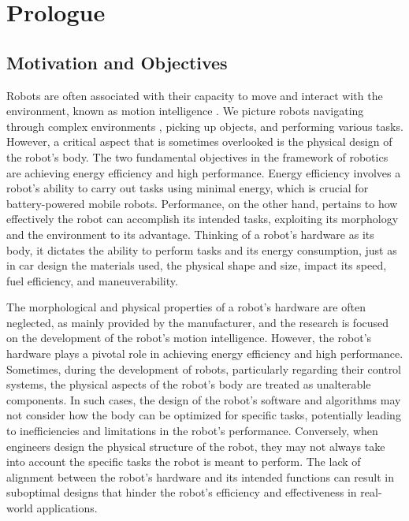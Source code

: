 \chapter*{Prologue}
\label{chp:00-Prologue}

\section*{Motivation and Objectives}

Robots are often associated with their capacity to move and interact with the environment, known as motion intelligence . We picture robots navigating through complex environments , picking up objects, and performing various tasks. However, a critical aspect that is sometimes overlooked is the physical design of the robot's body. The two fundamental objectives in the framework of robotics are achieving energy efficiency and high performance. Energy efficiency involves a robot's ability to carry out tasks using minimal energy, which is crucial for battery-powered mobile robots. Performance, on the other hand, pertains to how effectively the robot can accomplish its intended tasks, exploiting its morphology and the environment to its advantage. Thinking of a robot's hardware as its body, it dictates the ability to perform tasks and its energy consumption, just as in car design the materials used, the physical shape and size, impact its speed, fuel efficiency, and maneuverability.

The morphological and physical properties of a robot's hardware are often neglected, as mainly provided by the manufacturer, and the research is focused on the development of the robot's motion intelligence. However, the robot's hardware plays a pivotal role in achieving energy efficiency and high performance.
Sometimes, during the development of robots, particularly regarding their control systems, the physical aspects of the robot's body are treated as unalterable components. In such cases, the design of the robot's software and algorithms may not consider how the body can be optimized for specific tasks, potentially leading to inefficiencies and limitations in the robot's performance. Conversely, when engineers design the physical structure of the robot, they may not always take into account the specific tasks the robot is meant to perform. The lack of alignment between the robot's hardware and its intended functions can result in suboptimal designs that hinder the robot's efficiency and effectiveness in real-world applications.

